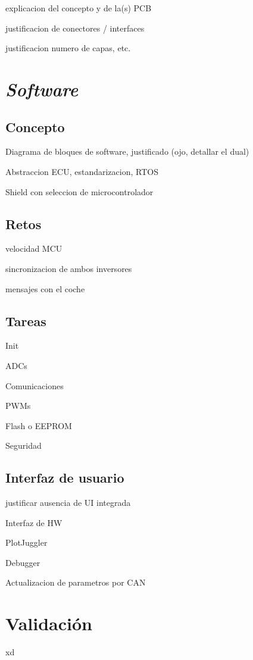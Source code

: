 explicacion del concepto y de la(s) PCB

justificacion de conectores / interfaces

justificacion numero de capas, etc.


\section{\textit{Software}}

\subsection{Concepto}

Diagrama de bloques de software, justificado (ojo, detallar el dual)

Abstraccion ECU, estandarizacion, RTOS

Shield con seleccion de microcontrolador


\subsection{Retos}

velocidad MCU

sincronizacion de ambos inversores

mensajes con el coche

\subsection{Tareas}

Init

ADCs

Comunicaciones

PWMs

Flash o EEPROM

Seguridad

\subsection{Interfaz de usuario}

justificar ausencia de UI integrada

Interfaz de HW 

PlotJuggler

Debugger

Actualizacion de parametros por CAN

\section{Validación}
xd


